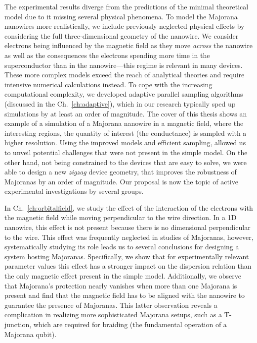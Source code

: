 The experimental results diverge from the predictions of the minimal theoretical model due to it missing several physical phenomena.
To model the Majorana nanowires more realistically, we include previously neglected physical effects by considering the full three-dimensional geometry of the nanowire.
We consider electrons being influenced by the magnetic field as they move \emph{across} the nanowire as well as the consequences the electrons spending more time in the superconductor than in the nanowire---this regime is relevant in many devices.
These more complex models exceed the reach of analytical theories and require intensive numerical calculations instead.
To cope with the increasing computational complexity, we developed adaptive parallel sampling algorithms (discussed in the Ch.~\ref{ch:adaptive}), which in our research typically sped up simulations by at least an order of magnitude.
The cover of this thesis shows an example of a simulation of a Majorana nanowire in a magnetic field, where the interesting regions, the quantity of interest (the conductance) is sampled with a higher resolution.
Using the improved models and efficient sampling, allowed us to unveil potential challenges that were not present in the simple model.
On the other hand, not being constrained to the devices that are easy to solve, we were able to design a new \emph{zigzag} device geometry, that improves the robustness of Majoranas by an order of magnitude.
Our proposal is now the topic of active experimental investigations by several groups.

In Ch.~\ref{ch:orbitalfield}, we study the effect of the interaction of the electrons with the magnetic field while moving perpendicular to the wire direction.
In a 1D nanowire, this effect is not present because there is no dimensional perpendicular to the wire.
This effect was frequently neglected in studies of Majoranas, however, systematically studying its role leads us to several conclusions for designing a system hosting Majoranas.
Specifically, we show that for experimentally relevant parameter values this effect has a stronger impact on the dispersion relation than the only magnetic effect present in the simple model.
Additionally, we observe that Majorana's protection nearly vanishes when more than one Majorana is present and find that the magnetic field has to be aligned with the nanowire to guarantee the presence of Majoranas.
This latter observation reveals a complication in realizing more sophisticated Majorana setups, such as a T-junction, which are required for braiding (the fundamental operation of a Majorana qubit).

